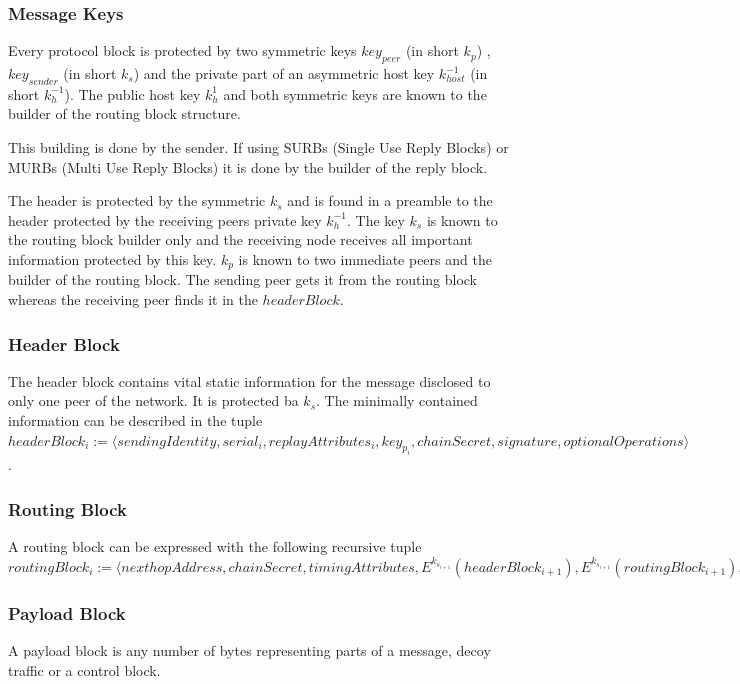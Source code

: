 \documentclass[9pt,journal,compsoc]{IEEEtran}
\begin{document}
\subsubsection{Message Keys}
Every protocol block is protected by two symmetric keys $key_{peer}$ (in short $k_p$) , $key_{sender}$ (in short $k_s$) and the private part of an asymmetric host key $k^{-1}_{host}$ (in short $k^{-1}_h$). The public host key $k^{1}_h$ and both symmetric keys are known to the builder of the routing block structure. 

This building is done by the sender. If using SURBs (Single Use Reply Blocks) or MURBs (Multi Use Reply Blocks) it is done by the builder of the reply block. 

The header is protected by the symmetric $k_s$ and is found in a preamble to the header protected by the receiving peers private key $k^{-1}_h$. The key $k_s$ is known to the routing block builder only and the receiving node receives all important information protected by this key. $k_{p}$ is known to two immediate peers and the builder of the routing block. The sending peer gets it from the routing block whereas the receiving peer finds it in the $headerBlock$. 

\subsubsection{Header Block}
The header block contains vital static information for the message disclosed to only one peer of the network. It is protected ba $k_s$. The minimally contained information can be described in the tuple $headerBlock_i:=\langle sendingIdentity,\allowbreak{} serial_i,\allowbreak{} replayAttributes_i,\allowbreak{} key_{p_i},\allowbreak{} chainSecret,\allowbreak{} signature,\allowbreak{} optionalOperations \rangle$.

\subsubsection{Routing Block}
A routing block can be expressed with the following recursive tuple $routingBlock_i:=\langle\allowbreak{} nexthopAddress,\allowbreak{} chainSecret,\allowbreak{} timingAttributes,\allowbreak{} E^{k_{s_{i+1}}}\left(headerBlock_{i+1}\right),\allowbreak{} E^{k_{s_{i+1}}}\left(routingBlock_{i+1}\right),\allowbreak{} payloadBuildInstructions_i,\allowbreak{} payloadId,\allowbreak{} optionalReplyBlocks \rangle$

\subsubsection{Payload Block}
A payload block is any number of bytes representing parts of a message, decoy traffic or a control block.
\end{document}
